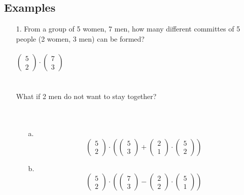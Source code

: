 \documentclass{article}
\begin{document}
\subsection*{Examples}
\begin{itemize}
    \item [1.]From a group of 5 women, 7 men, how many different committes of 5 people (2 women, 3 men) can be formed?\\
    \\
    \(\begin{pmatrix}
        5\\2
    \end{pmatrix}\cdot\begin{pmatrix}
        7\\3
    \end{pmatrix}\)\\ \\
    \\
    What if 2 men do not want to stay together?\\ \\ \\


\begin{itemize}
    \item [a.]\[\begin{pmatrix}
        5\\2
    \end{pmatrix}\cdot\left( \begin{pmatrix}
        5\\3
    \end{pmatrix}+\begin{pmatrix}
        2\\1
    \end{pmatrix}\cdot \begin{pmatrix}
        5\\2
    \end{pmatrix}\right)
\]
    \item[b.]\[\begin{pmatrix}
        5\\2
    \end{pmatrix}\cdot\left(\begin{pmatrix}
        7\\3
    \end{pmatrix}-\begin{pmatrix}
        2\\2
    \end{pmatrix}\cdot \begin{pmatrix}
        5\\1
    \end{pmatrix}\right)\]
    

\end{itemize}
\end{itemize}
\end{document}
